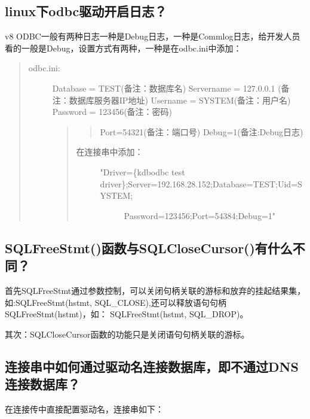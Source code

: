 \documentclass[letterpaper,10pt,english]{sphinxmanual}
\begin{document}
\subsection{linux下odbc驱动开启日志？}
\label{\detokenize{interface/odbc:id3}}
v8 ODBC一般有两种日志一种是Debug日志，一种是Commlog日志，给开发人员看的一般是Debug，设置方式有两种，一种是在odbc.ini中添加：
\begin{quote}
\begin{description}
\item[{odbc.ini:}] \leavevmode
Database = TEST(备注：数据库名)
Servername = 127.0.0.1 (备注：数据库服务器IP地址)
Username = SYSTEM(备注：用户名)
Password = 123456(备注：密码)
\begin{quote}
\begin{quote}

Port=54321(备注：端口号)
Debug=1(备注:Debug日志)
\end{quote}
\begin{description}
\item[{在连接串中添加：}] \leavevmode\begin{description}
\item[{"Driver=\{kdbodbc test driver\};Server=192.168.28.152;Database=TEST;Uid=SYSTEM;}] \leavevmode
Password=123456;Port=54384;Debug=1"

\end{description}

\end{description}
\end{quote}

\end{description}
\end{quote}


\subsection{SQLFreeStmt()函数与SQLCloseCursor()有什么不同？}
\label{\detokenize{interface/odbc:sqlfreestmt-sqlclosecursor}}
首先SQLFreeStmt通过参数控制，可以关闭句柄关联的游标和放弃的挂起结果集，    如:SQLFreeStmt(hstmt, SQL\_CLOSE),还可以释放语句句柄SQLFreeStmt(hstmt)，如：  SQLFreeStmt(hstmt, SQL\_DROP)。

其次：SQLCloseCursor函数的功能只是关闭语句句柄关联的游标。


\subsection{连接串中如何通过驱动名连接数据库，即不通过DNS连接数据库？}
\label{\detokenize{interface/odbc:dns}}
在连接传中直接配置驱动名，连接串如下：
\end{document}
